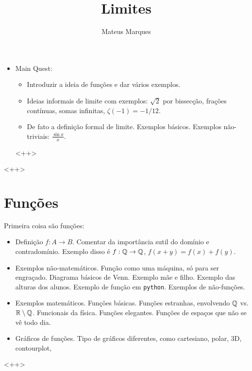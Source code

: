 \documentclass[a4paper,fleqn,12pt]{article}
\title{\Huge{\textbf{Limites}}}
\author{Mateus Marques}
\begin{document}
\maketitle

\begin{itemize}
\item Main Quest:
\begin{itemize}
\item Introduzir a ideia de funções e dar vários exemplos.
\item Ideias informais de limite com exemplos: $\sqrt{2}$ por bissecção, frações contínuas, somas infinitas, $\zeta(-1) = -1/12$.
\item De fato a definição formal de limite. Exemplos básicos. Exemplos não-triviais: $\frac{\sin x}{x}$.
\end{itemize}
<++>
\end{itemize}
<++>

\section{Funções}

Primeira coisa são funções:
\begin{itemize}
\item Definição $f: A \to B$. Comentar da importância sutil do domínio e contradomínio. Exemplo disso é $f:\mathbb{Q} \to \mathbb{Q}$, $f(x+y) = f(x) + f(y)$.
\item Exemplos não-matemáticos. Função como uma máquina, só para ser engraçado. Diagrama básicos de Venn. Exemplo mãe e filho. Exemplo das alturas dos alunos. Exemplo de função em \texttt{python}. Exemplos de não-funções.
\item Exemplos matemáticos. Funções básicas. Funções estranhas, envolvendo $\mathbb{Q}$ vs. $\mathbb{R}\setminus\mathbb{Q}$. Funcionais da física. Funções elegantes. Funções de espaços que não se vê todo dia.
\item Gráficos de funções. Tipo de gráficos diferentes, como cartesiano, polar, 3D, contourplot,
\end{itemize}
<++>
\end{document}
